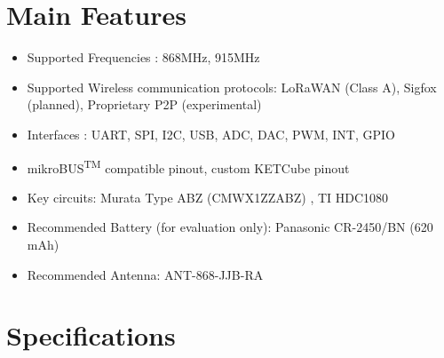 \section*{Main Features}
\begin{itemize}
  \item Supported Frequencies \cite{Murata:ABZ}: 868MHz, 915MHz
  \item Supported Wireless communication protocols: LoRaWAN (Class A), Sigfox (planned), Proprietary P2P (experimental)
  \item Interfaces \cite{Murata:ABZ}: UART, SPI, I2C, USB, ADC, DAC, PWM, INT, GPIO
  \item mikroBUS\textsuperscript{TM} compatible pinout, custom KETCube pinout
  \item Key circuits: Murata Type ABZ (CMWX1ZZABZ) \cite{Murata:ABZ}, TI HDC1080 \cite{TI:HDC1080}
  \item Recommended Battery (for evaluation only): Panasonic CR-2450/BN (620 mAh)
  \item Recommended Antenna: ANT-868-JJB-RA
\end{itemize}
\setcounter{tocdepth}{1}
\tableofcontents
\clearpage

\listoffigures
\listoftables
\begin{versionhistory}
\end{versionhistory}

\setcounter{table}{0}

\clearpage 
{} 
\pagestyle{headings} 

\clearpage
\section{Specifications}

